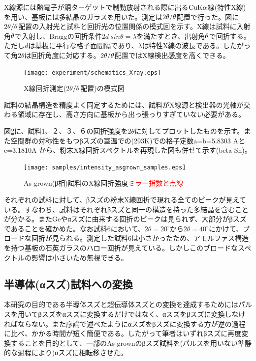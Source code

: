 X線源には熱電子が銅ターゲットで制動放射される際に出る$\rm CuK\alpha$線(特性X線)を用い、基板には多結晶のガラスを用いた。測定は$\rm 2\theta/\theta$配置で行った。図に$\rm 2\theta/\theta$配置の入射光と試料と回折光の位置関係の模式図を示す。X線は試料に入射角$\rm \theta$で入射し、Braggの回折条件$2d\:sin\theta=\lambda$を満たすとき、出射角$\rm \theta$で回折する。ただし$d$は基板に平行な格子面間隔であり、$\lambda$は特性X線の波長である。したがって角$2\theta$は回折角度に対応する。$\rm 2\theta/\theta$配置ではX線検出感度を高くできる。
\begin{figure}[!h]
    \begin{center}
   \texttt{[image: experiment/schematics\_Xray.eps]}
  \end{center}
  \caption{X線回折測定($\rm 2\theta/\theta$配置)の模式図}
  \label{fig:schematics_Xray}
\end{figure}

試料の結晶構造を精度よく同定するためには、試料がX線源と検出器の光軸が交わる領域に存在し、高さ方向に基板から出っ張っりすぎていない必要がある。

図\ref{fig:intensity_asgrown_samples}に、試料1、２、３、６の回折強度を$2\theta$に対してプロットしたものを示す。また空間群の対称性をもつβスズの室温での(293K)での格子定数a=b=5.8303 Aとc=3.1810A \cite{Wolcyrz}から、粉末X線回折スペクトルを再現した図も併せて示す(beta-Sn)。
\begin{figure}[!h]
    \begin{center}
   \texttt{[image: samples/intensity\_asgrown\_samples.eps]}
  \end{center}
  \caption{As grown(β相)試料のX線回折強度\textcolor{red}{ミラー指数と点線}}
  \label{fig:intensity_asgrown_samples}
\end{figure}

それぞれの試料に対して、βスズの粉末X線回折で現れる全てのピークが見えている。すなわち、試料はそれぞれβスズと同一の構造を持った多結晶を含むことが分かる。またGeやαスズに由来する回折のピークは見られず、大部分がβスズであることを確かめた。なお試料6において、$2\theta=20^\circ$から$2\theta=40^\circ$にかけて、ブロードな回折が見られる。測定した試料6は小さかったため、アモルファス構造を持つ基板の石英ガラスのハロー回折\cite{Speakman}が見えている。しかしこのブロードなスペクトルの影響は小さいため無視できる。

\subsection{半導体(αスズ)試料への変換}
本研究の目的である半導体スズと超伝導体スズとの変換を達成するためにはパルスを用いてβスズをαスズに変換するだけではなく、αスズをβスズに変換しなければならない。また序論で述べたようにαスズをβスズに変換する方が逆の過程に比べ、かかる時間が短く簡便である。したがって筆者はいずれβスズに再度変換することを目的として、一部のAs grownのβスズ試料を(パルスを用いない準静的な過程により)αスズに相転移させた。

